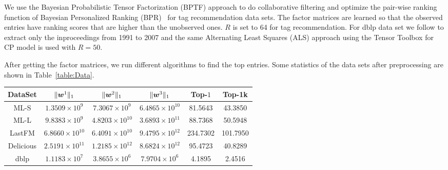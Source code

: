 \documentclass[10pt,journal,compsoc]{IEEEtran}
\newcommand{\V}[1]{{\boldsymbol{{\MakeLowercase{#1}}}}}
\newcommand{\Table}[1]{Table~\ref{table:#1}}
\begin{document}
We use the Bayesian Probabilistic Tensor Factorization (BPTF) approach to do collaborative filtering and optimize the pair-wise ranking function of Bayesian Personalized Ranking (BPR)~\cite{Rendle_BPR,Rendle_RTF} for tag recommendation data sets. The factor matrices are learned so that the observed entries have ranking scores that are higher than the unobserved ones. $R$ is set to 64 for tag recommendation. For dblp data set we follow \cite{AcarDunlavy09} to extract only the inproceedings from 1991 to 2007 and the same Alternating Least
Squares (ALS) approach using the Tensor Toolbox\cite{TTB_Software,TTB_Sparse} for CP model is used with $R=50$.

After getting the factor matrices, we run different algorithms to find the top entries. Some statistics of the data sets after preprocessing are shown in \Table{Data}.

\begin{table*}[!t]
	\renewcommand{\arraystretch}{1.3}
	\caption{Statistics for each data set}
	\label{table:Data}
	\centering
	\begin{tabular}{c|c|c|c|c|c}
	\hline
		 DataSet  &    $\|\V{w}^1\|_1$     &    $\|\V{w}^2\|_1$     &    $\|\V{w}^3\|_1$     & Top-$1$  &  Top-1k  \\
	\hline
		  ML-S    & $1.3509\times 10^{9}$  & $7.3067\times 10^{9}$  & $6.4865\times 10^{10}$ & 81.5643  & 43.3850  \\
		  ML-L    & $9.8383\times 10^{9}$  & $4.8203\times 10^{10}$ & $3.6893\times 10^{11}$ & 88.7368  & 50.5948  \\
		 LastFM   & $6.8660\times 10^{10}$ & $6.4091\times 10^{10}$ & $9.4795\times 10^{12}$ & 234.7302 & 101.7950 \\
		Delicious & $2.5191\times 10^{11}$ & $1.2185\times 10^{12}$ & $8.6824\times 10^{12}$ & 95.4723  & 40.8289  \\
		  dblp    &  $1.1183\times10^{7}$  &  $3.8655\times10^{6}$  & $7.9704\times 10^{6}$  &  4.1895  &  2.4516  \\
	\hline
	\end{tabular}
\end{table*}
\end{document}
